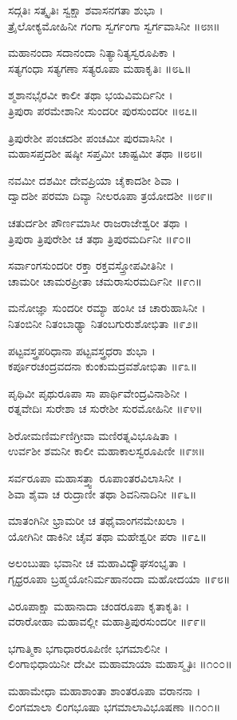 ಸದ್ಗತಿಃ ಸತ್ಕೃತಿಃ ಸ್ವಕ್ಷಾ ಶವಾಸನಗತಾ ಶುಭಾ ।\\
ತ್ರೈಲೋಕ್ಯಮೋಹಿನೀ ಗಂಗಾ ಸ್ವರ್ಗಂಗಾ ಸ್ವರ್ಗವಾಸಿನೀ ॥೮೫॥

ಮಹಾನಂದಾ ಸದಾನಂದಾ ನಿತ್ಯಾನಿತ್ಯಸ್ವರೂಪಿಕಾ ।\\
ಸತ್ಯಗಂಧಾ ಸತ್ಯಗಣಾ ಸತ್ಯರೂಪಾ ಮಹಾಕೃತಿಃ ॥೮೬॥

ಶ್ಮಶಾನಭೈರವೀ ಕಾಲೀ ತಥಾ ಭಯವಿಮರ್ದಿನೀ ।\\
ತ್ರಿಪುರಾ ಪರಮೇಶಾನೀ ಸುಂದರೀ ಪುರಸುಂದರೀ ॥೮೭॥

ತ್ರಿಪುರೇಶೀ ಪಂಚದಶೀ ಪಂಚಮೀ ಪುರವಾಸಿನೀ ।\\
ಮಹಾಸಪ್ತದಶೀ ಷಷ್ಠೀ ಸಪ್ತಮೀ ಚಾಷ್ಟಮೀ ತಥಾ ॥೮೮॥

ನವಮೀ ದಶಮೀ ದೇವಪ್ರಿಯಾ ಚೈಕಾದಶೀ ಶಿವಾ ।\\
ದ್ವಾದಶೀ ಪರಮಾ ದಿವ್ಯಾ ನೀಲರೂಪಾ ತ್ರಯೋದಶೀ ॥೮೯॥

ಚತುರ್ದಶೀ ಪೌರ್ಣಮಾಸೀ ರಾಜರಾಜೇಶ್ವರೀ ತಥಾ ।\\
ತ್ರಿಪುರಾ ತ್ರಿಪುರೇಶೀ ಚ ತಥಾ ತ್ರಿಪುರಮರ್ದಿನೀ ॥೯೦॥

ಸರ್ವಾಂಗಸುಂದರೀ ರಕ್ತಾ ರಕ್ತವಸ್ತ್ರೋಪವೀತಿನೀ ।\\
ಚಾಮರೀ ಚಾಮರಪ್ರೀತಾ ಚಮರಾಸುರಮರ್ದಿನೀ ॥೯೧॥

ಮನೋಜ್ಞಾ ಸುಂದರೀ ರಮ್ಯಾ ಹಂಸೀ ಚ ಚಾರುಹಾಸಿನೀ ।\\
ನಿತಂಬಿನೀ ನಿತಂಬಾಢ್ಯಾ ನಿತಂಬಗುರುಶೋಭಿತಾ ॥೯೨॥

ಪಟ್ಟವಸ್ತ್ರಪರಿಧಾನಾ ಪಟ್ಟವಸ್ತ್ರಧರಾ ಶುಭಾ ।\\
ಕರ್ಪೂರಚಂದ್ರವದನಾ ಕುಂಕುಮದ್ರವಶೋಭಿತಾ ॥೯೩॥

ಪೃಥಿವೀ ಪೃಥುರೂಪಾ ಸಾ ಪಾರ್ಥಿವೇಂದ್ರವಿನಾಶಿನೀ ।\\
ರತ್ನವೇದಿಃ ಸುರೇಶಾ ಚ ಸುರೇಶೀ ಸುರಮೋಹಿನೀ ॥೯೪॥

ಶಿರೋಮಣಿರ್ಮಣಿಗ್ರೀವಾ ಮಣಿರತ್ನವಿಭೂಷಿತಾ ।\\
ಉರ್ವಶೀ ಶಮನೀ ಕಾಲೀ ಮಹಾಕಾಲಸ್ವರೂಪಿಣೀ ॥೯೫॥

ಸರ್ವರೂಪಾ ಮಹಾಸತ್ತ್ವಾ ರೂಪಾಂತರವಿಲಾಸಿನೀ ।\\
ಶಿವಾ ಶೈವಾ ಚ ರುದ್ರಾಣೀ ತಥಾ ಶಿವನಿನಾದಿನೀ ॥೯೬॥

ಮಾತಂಗಿನೀ ಭ್ರಾಮರೀ ಚ ತಥೈವಾಂಗನಮೇಖಲಾ ।\\
ಯೋಗಿನೀ ಡಾಕಿನೀ ಚೈವ ತಥಾ ಮಹೇಶ್ವರೀ ಪರಾ ॥೯೭॥

ಅಲಂಬುಷಾ ಭವಾನೀ ಚ ಮಹಾವಿದ್ಯೌಘಸಂಭೃತಾ ।\\
ಗೃಧ್ರರೂಪಾ ಬ್ರಹ್ಮಯೋನಿರ್ಮಹಾನಂದಾ ಮಹೋದಯಾ ॥೯೮॥

ವಿರೂಪಾಕ್ಷಾ ಮಹಾನಾದಾ ಚಂಡರೂಪಾ ಕೃತಾಕೃತಿಃ ।\\
ವರಾರೋಹಾ ಮಹಾವಲ್ಲೀ ಮಹಾತ್ರಿಪುರಸುಂದರೀ ॥೯೯॥

ಭಗಾತ್ಮಿಕಾ ಭಗಾಧಾರರೂಪಿಣೀ ಭಗಮಾಲಿನೀ ।\\
ಲಿಂಗಾಭಿಧಾಯಿನೀ ದೇವೀ ಮಹಾಮಾಯಾ ಮಹಾಸ್ಮೃತಿಃ ॥೧೦೦॥

ಮಹಾಮೇಧಾ ಮಹಾಶಾಂತಾ ಶಾಂತರೂಪಾ ವರಾನನಾ ।\\
ಲಿಂಗಮಾಲಾ ಲಿಂಗಭೂಷಾ ಭಗಮಾಲಾವಿಭೂಷಣಾ ॥೧೦೧॥

